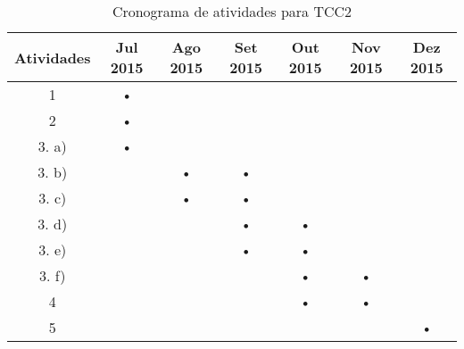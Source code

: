\begin{table}[h]
    \centering

    \begin{tabular}{|c|c|c|c|c|c|c|}
        \hline
        \textbf{Atividades} & \textbf{Jul 2015} & \textbf{Ago 2015} & \textbf{Set 2015}
        & \textbf{Out 2015} & \textbf{Nov 2015} & \textbf{Dez 2015} \\
        \hline\hline

        \hline
        1   & • &   &   &   &   &   \\

        \hline
        2   & • &   &   &   &   &   \\

        \hline
        3. a)   & • &   &   &   &   &   \\

        \hline
        3. b)   &   & • & • &   &   &   \\

        \hline
        3. c)   &   & • & • &   &   &   \\

        \hline
        3. d)   &   &   & • & • &   &   \\

        \hline
        3. e)   &   &   & • & • &   &   \\

        \hline
        3. f)   &   &   &   & • & • &   \\

        \hline
        4   &   &   &   & • & • &   \\

        \hline
        5   &   &   &   &   &   & • \\

        \hline
    \end{tabular}

    \caption{Cronograma de atividades para TCC2}
    \label{cronograma}
\end{table}